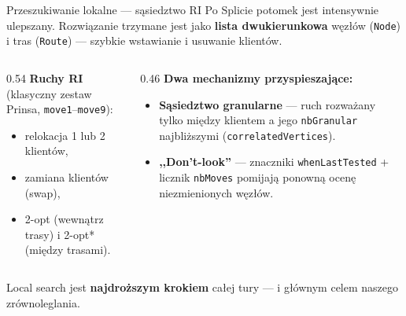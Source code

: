 \documentclass[aspectratio=169,11pt]{beamer}
\begin{document}
\begin{frame}{Przeszukiwanie lokalne — sąsiedztwo RI}
  Po Splicie potomek jest intensywnie ulepszany. Rozwiązanie trzymane jest jako \textbf{lista dwukierunkowa} węzłów (\texttt{Node}) i tras (\texttt{Route}) — szybkie wstawianie i usuwanie klientów.
  \vfill
  \begin{columns}[T]
    \begin{column}{0.54\textwidth}
      \textbf{Ruchy RI} (klasyczny zestaw Prinsa, \texttt{move1}--\texttt{move9}):
      \begin{itemize}
        \item relokacja 1 lub 2 klientów,
        \item zamiana klientów (swap),
        \item 2-opt (wewnątrz trasy) i 2-opt* (między trasami).
      \end{itemize}
    \end{column}
    \begin{column}{0.46\textwidth}
      \textbf{Dwa mechanizmy przyspieszające:}
      \begin{itemize}
        \item \textbf{Sąsiedztwo granularne} — ruch rozważany tylko między klientem a jego \texttt{nbGranular} najbliższymi (\texttt{correlatedVertices}).
        \item \textbf{,,Don't-look''} — znaczniki \texttt{whenLastTested} + licznik \texttt{nbMoves} pomijają ponowną ocenę niezmienionych węzłów.
      \end{itemize}
    \end{column}
  \end{columns}
  \vfill
  {\footnotesize Local search jest \textbf{najdroższym krokiem} całej tury — i głównym celem naszego zrównoleglania.}
\end{frame}
\end{document}
